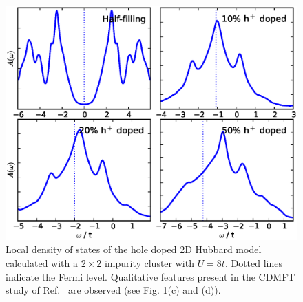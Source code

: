 \documentclass[aps,twocolumn,nobibnotes]{revtex4}
\begin{document}
\begin{figure}
\begin{center}
    \vspace{-2mm}
\includegraphics[scale=0.425]{2DHub_Doping.eps}
\end{center}
    \vspace{-8mm}
\caption{Local density of states of the hole doped 2D Hubbard model calculated with a $2 \times 2$ impurity cluster with $U = 8t$. Dotted
lines indicate the Fermi level. Qualitative features present in the CDMFT study of Ref.~ are observed (see Fig. 1(c) and (d)).}
\label{2D_Doped}
\end{figure}
\end{document}

